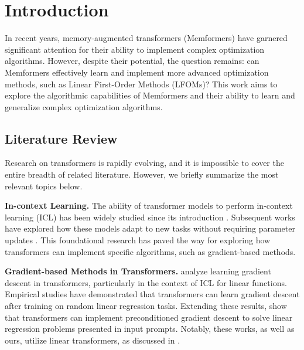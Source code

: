 \chapter{Introduction}
\label{sec:Chapter0} 

In recent years, memory-augmented transformers (Memformers) have garnered significant attention for their ability to implement complex optimization algorithms. However, despite their potential, the question remains: can Memformers effectively learn and implement more advanced optimization methods, such as Linear First-Order Methods (LFOMs)? This work aims to explore the algorithmic capabilities of Memformers and their ability to learn and generalize complex optimization algorithms.

\section{Literature Review}
Research on transformers is rapidly evolving, and it is impossible to cover the entire breadth of related literature. However, we briefly summarize the most relevant topics below.

\textbf{In-context Learning.} The ability of transformer models to perform in-context learning (ICL) has been widely studied since its introduction \cite{NEURIPS2020_1457c0d6}. Subsequent works have explored how these models adapt to new tasks without requiring parameter updates \cite{xie2022explanationincontextlearningimplicit, vonoswald2024uncoveringmesaoptimizationalgorithmstransformers, hahn2023theoryemergentincontextlearning, liu2021makesgoodincontextexamples, lu2022fantasticallyorderedpromptsthem, NEURIPS2022_9d560961, wu2023selfadaptiveincontextlearninginformation}. This foundational research has paved the way for exploring how transformers can implement specific algorithms, such as gradient-based methods.

\textbf{Gradient-based Methods in Transformers.} \cite{garg2022can} analyze learning gradient descent in transformers, particularly in the context of ICL for linear functions. Empirical studies \cite{garg2022can, akyurek2022learning, pmlr-v202-von-oswald23a} have demonstrated that transformers can learn gradient descent after training on random linear regression tasks. Extending these results, \cite{pmlr-v202-von-oswald23a, ahn2023transformerslearnimplementpreconditioned} show that transformers can implement preconditioned gradient descent to solve linear regression problems presented in input prompts. Notably, these works, as well as ours, utilize linear transformers, as discussed in \cite{schlag2021lineartransformerssecretlyfast, pmlr-v202-von-oswald23a, ahn2023linear}.

